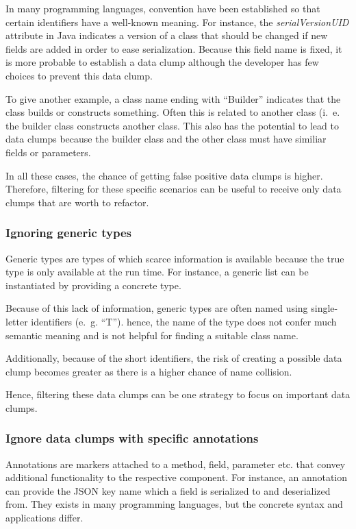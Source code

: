 In many programming languages, convention have been established so that certain identifiers have a well-known meaning. For instance, the \textit{serialVersionUID} attribute in Java indicates a version of a class that should be changed if new fields are added in order to ease serialization. Because this field name is fixed, it is more probable to establish a data clump although the developer has few choices to prevent this data clump.

To give another example, a class name ending with \enquote{Builder} indicates that the class builds or constructs something. Often this is related to another class (i.~e. the builder class constructs another class. This also has the potential to lead to data clumps because the builder class and the other class must have similiar fields or parameters. 

In all these cases, the chance of getting false positive data clumps is higher. Therefore, filtering for these specific scenarios can be useful to receive only data clumps that are worth to refactor. 

\subsubsection{Ignoring generic types}
Generic types are types of which scarce information is available because the true type is only available at the run time. For instance, a generic list can be instantiated by providing a concrete type.

Because of this lack of information, generic types are often named using  single-letter identifiers (e.~g. \enquote{T}). hence, the name of the type does not confer much semantic meaning and is not helpful for finding a suitable class name. 

Additionally, because of the short identifiers, the risk of creating a possible data clump becomes greater as there is a higher chance of name collision.

Hence, filtering these data clumps can be one strategy to focus on important data clumps. 

\subsubsection{Ignore data clumps with specific annotations}

Annotations are markers attached to a method, field, parameter etc. that convey additional functionality to the respective component. For instance, an annotation can provide the \ac{JSON} key name which a field is serialized to and deserialized from.  They exists in many programming languages, but the concrete syntax and applications differ.

